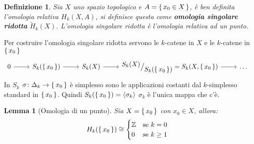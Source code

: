 \documentclass[10pt, twoside=false, x11names]{scrbook}
\newtheorem{lemma}[theorem]{Lemma}
\newtheorem{definition}[theorem]{Definizione}
\newcommand{\Z}{\mathbb{Z}}
\newcommand*\quot[2]{{^{\textstyle #1}\big/_{\textstyle #2}}}
\begin{document}
\begin{definition}
  Sia $ X $ uno spazio topologico e $ A = \set{x_0 \in X} $, è ben definita l'omologia
  relativa $ H_k(X, A) $, si definisce questa come \textbf{omologia singolare ridotta}
  $ \tilde{H}_k(X) $.
  L'omologia singolare ridotta è l'omologia relativa ad un punto.
\end{definition}
Per costruire l'omologia singolare ridotta servono le $ k $-catene in $ X $ e le
$ k $-catene in $ \set{x_0} $
\[
  \begin{tikzcd}
    0 \arrow{r}{} & S_k(\set{x_0}) \arrow{r}{} & S_k(X) \arrow{r}{} & \quot{S_k(X)}{S_k({\set{x_0}})} = S_k(X, \set{x_0}) \arrow{r}{} & \dots
  \end{tikzcd}
\]
In $ S_k $ $ \sigma \colon \Delta_k \to \set{x_0} $ è simplesso sono le applicazioni costanti
dal $ k $-simplesso standard in $ \set{x_0} $. Quindi $ S_k(\set{x_0}) = \langle\sigma_k\rangle $
$ \sigma_k $ è l'unica mappa che c'è.
\begin{lemma}[Omologia di un punto]
  Sia $ X = \set{x_0} $ con $ x_0 \in X $, allora:
  \[
    H_k(\set{x_0}) \cong
    \begin{cases}
      \Z & \text{se } k = 0 \\
      0 & \text{se } k \geq 1
    \end{cases}
  \]
\end{lemma}
\end{document}
